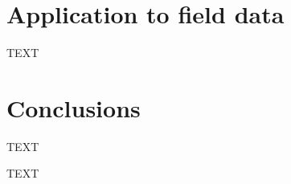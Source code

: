 \documentclass[journal abbreviation, npg]{copernicus}
\begin{document}
\section{Application to field data}
TEXT

\section{Conclusions}
TEXT



\begin{acknowledgements}
TEXT
\end{acknowledgements}








\end{document}

